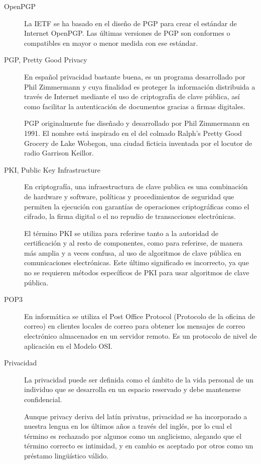 \begin{description}
\item[OpenPGP]
La IETF se ha basado en el diseño de PGP para crear el estándar de Internet OpenPGP. Las últimas versiones de PGP son conformes o compatibles en mayor o menor medida con ese estándar. 

\item[PGP, Pretty Good Privacy]
En español privacidad bastante buena, es un programa desarrollado por Phil Zimmermann y cuya finalidad es proteger la información distribuida a través de Internet mediante el uso de criptografía de clave pública, así como facilitar la autenticación de documentos gracias a firmas digitales.

PGP originalmente fue diseñado y desarrollado por Phil Zimmermann en 1991. El nombre está inspirado en el del colmado Ralph's Pretty Good Grocery de Lake Wobegon, una ciudad ficticia inventada por el locutor de radio Garrison Keillor.

\item[PKI, Public Key Infrastructure]
En criptografía, una infraestructura de clave publica es una combinación de hardware y software, políticas y procedimientos de seguridad que permiten la ejecución con garantías de operaciones criptográficas como el cifrado, la firma digital o el no repudio de transacciones electrónicas.

El término PKI se utiliza para referirse tanto a la autoridad de certificación y al resto de componentes, como para referirse, de manera más amplia y a veces confusa, al uso de algoritmos de clave pública en comunicaciones electrónicas. Este último significado es incorrecto, ya que no se requieren métodos específicos de PKI para usar algoritmos de clave pública.


\item[POP3]
En informática se utiliza el Post Office Protocol (Protocolo de la oficina de correo) en clientes locales de correo para obtener los mensajes de correo electrónico almacenados en un servidor remoto. Es un protocolo de nivel de aplicación en el Modelo OSI.

\item[Privacidad]
La privacidad puede ser definida como el ámbito de la vida personal de un individuo que se desarrolla en un espacio reservado y debe mantenerse confidencial.

Aunque privacy deriva del latín privatus, privacidad se ha incorporado a nuestra lengua en los últimos años a través del inglés, por lo cual el término es rechazado por algunos como un anglicismo, alegando que el término correcto es intimidad, y en cambio es aceptado por otros como un préstamo lingüístico válido.


\end{description}
